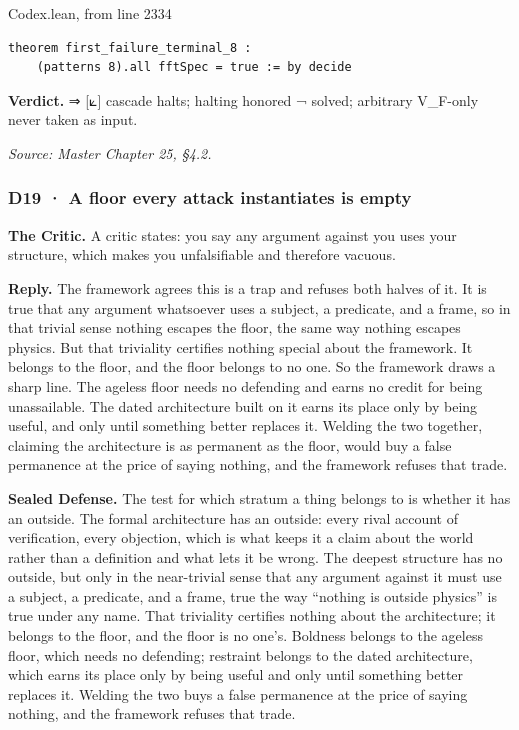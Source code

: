\documentclass[10pt,twocolumn]{article}
\begin{document}
\begin{leanexcerpt}{Codex.lean, from line 2334}
\begin{lstlisting}[style=leanx,firstnumber=2334]
theorem first_failure_terminal_8 :
    (patterns 8).all fftSpec = true := by decide
\end{lstlisting}
\end{leanexcerpt}

\textbf{Verdict.} ⇒ {[}⟀{]} cascade halts; halting honored ¬ solved;
arbitrary V\_F-only never taken as input.

\emph{Source: Master Chapter 25, §4.2.}

\hypertarget{d19-a-floor-every-attack-instantiates-is-empty}{%
\subsubsection{D19 · A floor every attack instantiates is
empty}\label{d19-a-floor-every-attack-instantiates-is-empty}}

\textbf{The Critic.} A critic states: you say any argument against you
uses your structure, which makes you unfalsifiable and therefore
vacuous.

\textbf{Reply.} The framework agrees this is a trap and refuses both
halves of it. It is true that any argument whatsoever uses a subject, a
predicate, and a frame, so in that trivial sense nothing escapes the
floor, the same way nothing escapes physics. But that triviality
certifies nothing special about the framework. It belongs to the floor,
and the floor belongs to no one. So the framework draws a sharp line.
The ageless floor needs no defending and earns no credit for being
unassailable. The dated architecture built on it earns its place only by
being useful, and only until something better replaces it. Welding the
two together, claiming the architecture is as permanent as the floor,
would buy a false permanence at the price of saying nothing, and the
framework refuses that trade.

\textbf{Sealed Defense.} The test for which stratum a thing belongs to
is whether it has an outside. The formal architecture has an outside:
every rival account of verification, every objection, which is what
keeps it a claim about the world rather than a definition and what lets
it be wrong. The deepest structure has no outside, but only in the
near-trivial sense that any argument against it must use a subject, a
predicate, and a frame, true the way ``nothing is outside physics'' is
true under any name. That triviality certifies nothing about the
architecture; it belongs to the floor, and the floor is no one's.
Boldness belongs to the ageless floor, which needs no defending;
restraint belongs to the dated architecture, which earns its place only
by being useful and only until something better replaces it. Welding the
two buys a false permanence at the price of saying nothing, and the
framework refuses that trade.
\end{document}

